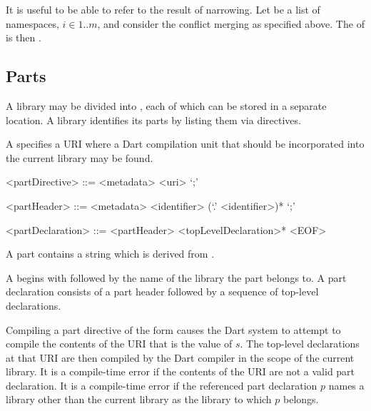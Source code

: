 \documentclass[makeidx]{article}
\begin{document}
{

\LMHash{}%
It is useful to be able to refer to the result of narrowing.
Let  be a list of namespaces, $i \in 1 .. m$,
and consider the conflict merging as specified above.
The
of  is then .


\subsection{Parts}

\LMHash{}%
A library may be divided into ,
each of which can be stored in a separate location.
A library identifies its parts by listing them via \PART{} directives.

\LMHash{}%
A  specifies a URI where
a Dart compilation unit that should be incorporated into the current library
may be found.

\begin{grammar}
<partDirective> ::= <metadata> \PART{} <uri> `;'

<partHeader> ::= <metadata> \PART{} \OF{} <identifier> (`.' <identifier>)* `;'

<partDeclaration> ::= <partHeader> <topLevelDeclaration>* <EOF>
\end{grammar}

\LMHash{}%
A part contains a string which is derived from .


\LMHash{}%
A  begins with \PART{} \OF{} followed by
the name of the library the part belongs to.
A part declaration consists of a part header followed by
a sequence of top-level declarations.

\LMHash{}%
Compiling a part directive of the form  causes the Dart system to attempt to compile the contents of the URI that is the value of $s$.
The top-level declarations at that URI are then compiled by the Dart compiler in the scope of the current library.
It is a compile-time error if the contents of the URI are not a valid part declaration.
It is a compile-time error if the referenced part declaration $p$ names a library other than the current library as the library to which $p$ belongs.

}
\end{document}
